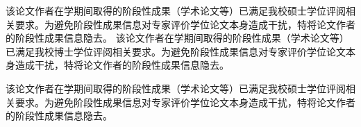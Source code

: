 \begin{resume}
\ifreview

\ifismaster
该论文作者在学期间取得的阶段性成果（学术论文等）已满足我校硕士学位评阅相关要求。为避免阶段性成果信息对专家评价学位论文本身造成干扰，特将论文作者的阶段性成果信息隐去。
\else
该论文作者在学期间取得的阶段性成果（学术论文等）已满足我校博士学位评阅相关要求。为避免阶段性成果信息对专家评价学位论文本身造成干扰，特将论文作者的阶段性成果信息隐去。
\fi

\else

\ifisresumebib
该论文作者在学期间取得的阶段性成果（学术论文等）已满足我校硕士学位评阅相关要求。为避免阶段性成果信息对专家评价学位论文本身造成干扰，特将论文作者的阶段性成果信息隐去。
%	
%


%	
%

\else

%
%
%
\fi
\fi
\end{resume}
